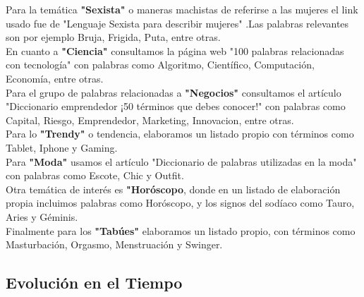 \documentclass[a4paper]{article}
\begin{document}
Para la tem\'atica \textbf{"Sexista"} o maneras machistas de referirse a las mujeres el link usado fue de "Lenguaje Sexista para describir mujeres" \cite{machismo}.Las palabras relevantes son por ejemplo Bruja, Frigida, Puta, entre otras.\\

En cuanto a \textbf{"Ciencia"} consultamos la p\'agina web "100 palabras relacionadas con tecnolog\'ia" \cite{tecnologia} con palabras como Algoritmo, Cient\'ifico, Computaci\'on, Econom\'ia, entre otras.\\

Para el grupo de palabras relacionadas a \textbf{"Negocios"} consultamos el art\'iculo "Diccionario emprendedor ¡50 t\'erminos que debes conocer!" \cite{negocios} con palabras como Capital, Riesgo, Emprendedor, Marketing, Innovacion, entre otras.\\

Para lo \textbf{"Trendy"} o tendencia, elaboramos un listado propio con t\'erminos como Tablet, Iphone y Gaming.\\

Para \textbf{"Moda"} usamos el art\'iculo "Diccionario de palabras utilizadas en la moda" \cite{moda} con palabras como Escote, Chic y Outfit.\\

Otra tem\'atica de inter\'es es \textbf{"Hor\'oscopo}, donde en un listado de elaboraci\'on propia incluimos palabras como Hor\'oscopo, y los signos del sod\'iaco como Tauro, Aries y G\'eminis.\\

Finalmente para los \textbf{"Tab\'ues"} elaboramos un listado propio, con t\'erminos como Masturbaci\'on, Orgasmo, Menstruaci\'on y Swinger.\\




\subsection{Evoluci\'on en el Tiempo}
\end{document}
